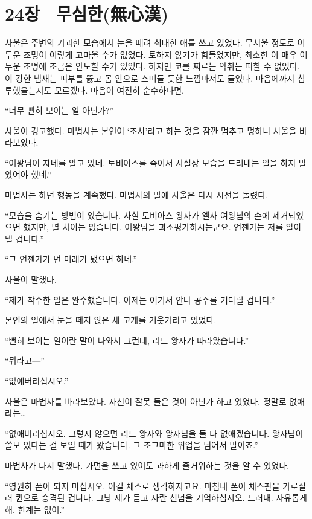 ﻿

\chapter[24장  무심한(無心漢)][24장\hspace*{.5em}무심한(無心漢)]{24장 \ 무심한(無心漢)}



사울은 주변의 기괴한 모습에서 눈을 떼려 최대한 애를 쓰고 있었다. 무서울 정도로 어두운 조명이 이렇게 고마울 수가 없었다. 토하지 않기가 힘들었지만, 최소한 이 매우 어두운 조명에 조금은 안도할 수가 있었다. 하지만 코를 찌르는 악취는 피할 수 없었다. 이 강한 냄새는 피부를 뚫고 몸 안으로 스며들 듯한 느낌마저도 들었다. 마음에까지 침투했을는지도 모르겠다. 마음이 여전히 순수하다면.

``너무 뻔히 보이는 일 아닌가?''

사울이 경고했다. 마법사는 본인이 `조사'라고 하는 것을 잠깐 멈추고 멍하니 사울을 바라보았다.

``여왕님이 자네를 알고 있네. 토비아스를 죽여서 사실상 모습을 드러내는 일을 하지 말았어야 했네.''

마법사는 하던 행동을 계속했다. 마법사의 말에 사울은 다시 시선을 돌렸다.

``모습을 숨기는 방법이 있습니다. 사실 토비아스 왕자가 엘사 여왕님의 손에 제거되었으면 했지만, 별 차이는 없습니다. 여왕님을 과소평가하시는군요. 언젠가는 저를 알아낼 겁니다.''

``그 언젠가가 먼 미래가 됐으면 하네.''

사울이 말했다.

``제가 착수한 일은 완수했습니다. 이제는 여기서 안나 공주를 기다릴 겁니다.''

본인의 일에서 눈을 떼지 않은 채 고개를 기웃거리고 있었다.

``뻔히 보이는 일이란 말이 나와서 그런데, 리드 왕자가 따라왔습니다.''

``뭐라고—''

``없애버리십시오.''

사울은 마법사를 바라보았다. 자신이 잘못 들은 것이 아닌가 하고 있었다. 정말로 없애라는\ldots

``없애버리십시오. 그렇지 않으면 리드 왕자와 왕자님을 둘 다 없애겠습니다. 왕자님이 쓸모 있다는 걸 보일 때가 왔습니다. 그 조그마한 위업을 넘어서 말이죠.''

마법사가 다시 말했다. 가면을 쓰고 있어도 과하게 즐거워하는 것을 알 수 있었다.

``영원히 폰이 되지 마십시오. 이걸 체스로 생각하자고요. 마침내 폰이 체스판을 가로질러 퀸으로 승격된 겁니다. 그냥 제가 듣고 자란 신념을 기억하십시오. 드러내. 자유롭게 해. 한계는 없어.''

